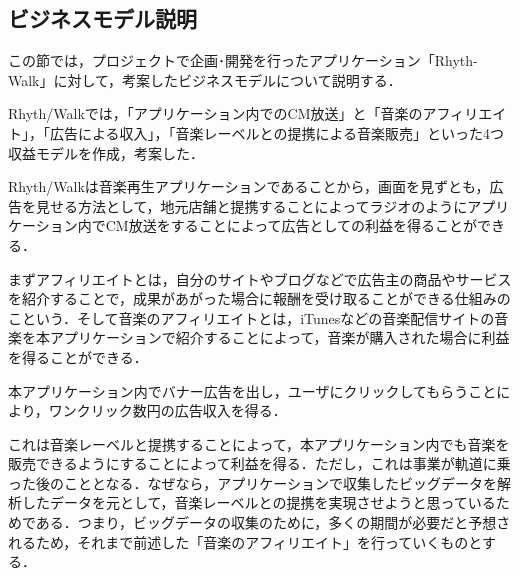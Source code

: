 \subsection{ビジネスモデル説明}

\par
この節では，プロジェクトで企画･開発を行ったアプリケーション「Rhyth-Walk」に対して，考案したビジネスモデルについて説明する．
\par
Rhyth/Walkでは，「アプリケーション内でのCM放送」と「音楽のアフィリエイト」，「広告による収入」，「音楽レーベルとの提携による音楽販売」といった4つ収益モデルを作成，考案した．
\par
{}
Rhyth/Walkは音楽再生アプリケーションであることから，画面を見ずとも，広告を見せる方法として，地元店舗と提携することによってラジオのようにアプリケーション内でCM放送をすることによって広告としての利益を得ることができる．
\par
{}
まずアフィリエイトとは，自分のサイトやブログなどで広告主の商品やサービスを紹介することで，成果があがった場合に報酬を受け取ることができる仕組みのこという．そして音楽のアフィリエイトとは，iTunesなどの音楽配信サイトの音楽を本アプリケーションで紹介することによって，音楽が購入された場合に利益を得ることができる．
\par
{}
本アプリケーション内でバナー広告を出し，ユーザにクリックしてもらうことにより，ワンクリック数円の広告収入を得る．
\par
{}
これは音楽レーベルと提携することによって，本アプリケーション内でも音楽を販売できるようにすることによって利益を得る．ただし，これは事業が軌道に乗った後のこととなる．なぜなら，アプリケーションで収集したビッグデータを解析したデータを元として，音楽レーベルとの提携を実現させようと思っているためである．つまり，ビッグデータの収集のために，多くの期間が必要だと予想されるため，それまで前述した「音楽のアフィリエイト」を行っていくものとする．
